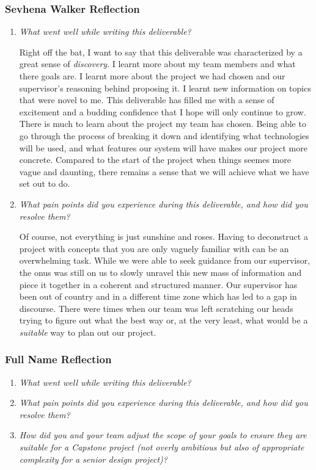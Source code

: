 \documentclass{article}
\begin{document}
\subsubsection*{Sevhena Walker Reflection}
\begin{enumerate}
  \item \textit{What went well while writing this deliverable?}

    Right off the bat, I want to say that this deliverable was characterized by a great sense of \textit{discovery}. I learnt more about my team members and what there goals are. I learnt more about the project we had chosen and our supervisor's reasoning behind proposing it. I learnt new information on topics that were novel to me. This deliverable has filled me with a sense of excitement and a budding confidence that I hope will only continue to grow. \\
    
    There is much to learn about the project my team has chosen. Being able to go through the process of breaking it down and identifying what technologies will be used, and what features our system will have makes our project more concrete. Compared to the start of the project when things seemes more vague and daunting, there remains a sense that we will achieve what we have set out to do.
  \item \textit{What pain points did you experience during this deliverable, and how did you resolve them?}
  
    Of course, not everything is just sunshine and roses. Having to deconstruct a project with concepts that you are only vaguely familiar with can be an overwhelming task. While we were able to seek guidance from our supervisor, the onus was still on us to slowly unravel this new mass of information and piece it together in a coherent and structured manner. Our supervisor has been out of country and in a different time zone which has led to a gap in discourse. There were times when our team was left scratching our heads trying to figure out what the best way or, at the very least, what would be a \textit{suitable} way to plan out our project. 

\end{enumerate}

\subsubsection*{Full Name Reflection}
\begin{enumerate}
  \item \textit{What went well while writing this deliverable?}
  \item \textit{What pain points did you experience during this deliverable, and how did you resolve them?}
  \item \textit{How did you and your team adjust the scope of your goals to ensure they are suitable for a Capstone project (not overly 
  ambitious but also of appropriate complexity for a senior design project)?}
\end{enumerate}
\end{document}
